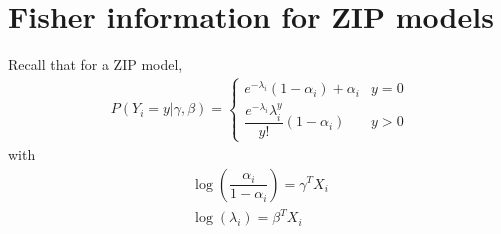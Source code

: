 \documentclass[11pt]{article}
\begin{document}
\vspace{0.5cm}

\section*{Fisher information for ZIP models}

Recall that for a ZIP model,
\begin{align*}
P(Y_i = y | \gamma, \beta) = \begin{cases}
e^{-\lambda_i}(1 - \alpha_i) + \alpha_i & y = 0 \\
\dfrac{e^{-\lambda_i} \lambda_i^y}{y!}(1 - \alpha_i) & y > 0
\end{cases}
\end{align*}
with 
\begin{align*}
\log \left( \dfrac{\alpha_i}{1 - \alpha_i} \right) = \gamma^T X_i \\
\log(\lambda_i) = \beta^T X_i
\end{align*}
\end{document}
